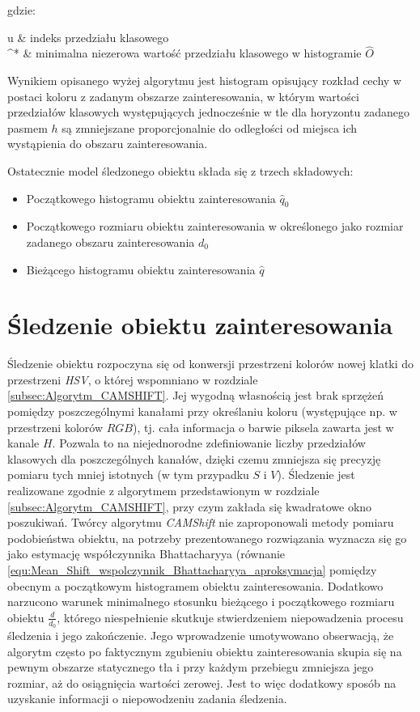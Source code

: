 \noindent
gdzie:
\begin{conditions}
	 u & indeks przedziału klasowego  \\
	 ^* & minimalna niezerowa wartość przedziału klasowego w histogramie $\hat{O}$
\end{conditions}

Wynikiem opisanego wyżej algorytmu jest histogram opisujący rozkład cechy w postaci koloru z zadanym obszarze zainteresowania, w którym wartości przedziałów klasowych występujących jednocześnie w tle dla horyzontu zadanego pasmem $h$ są zmniejszane proporcjonalnie do odległości od miejsca ich wystąpienia do obszaru zainteresowania.

Ostatecznie model śledzonego obiektu składa się z trzech składowych:

\begin{itemize}

	\item Początkowego histogramu obiektu zainteresowania $\hat{q}_0$
	\item Początkowego rozmiaru obiektu zainteresowania w określonego jako rozmiar zadanego obszaru zainteresowania $d_0$
	\item Bieżącego histogramu obiektu zainteresowania $\hat{q}$

\end{itemize}

\section{Śledzenie obiektu zainteresowania}
\label{sec:Modul_CAMShift_Sledzenie_obiektu_zainteresowania}

Śledzenie obiektu rozpoczyna się od konwersji przestrzeni kolorów nowej klatki do przestrzeni \textit{HSV}, o której wspomniano w rozdziale \ref{subsec:Algorytm_CAMSHIFT}. Jej wygodną własnością jest brak sprzężeń pomiędzy poszczególnymi kanałami przy określaniu koloru (występujące np. w przestrzeni kolorów $RGB$), tj. cała informacja o barwie piksela zawarta jest w kanale $H$. Pozwala to na niejednorodne zdefiniowanie liczby przedziałów klasowych dla poszczególnych kanałów, dzięki czemu zmniejsza się precyzję pomiaru tych mniej istotnych (w tym przypadku $S$ i $V$). Śledzenie jest realizowane zgodnie z algorytmem przedstawionym w rozdziale \ref{subsec:Algorytm_CAMSHIFT}, przy czym zakłada się kwadratowe okno poszukiwań. Twórcy algorytmu \textit{CAMShift} nie zaproponowali metody pomiaru podobieństwa obiektu, na potrzeby prezentowanego rozwiązania wyznacza się go jako estymację współczynnika Bhattacharyya (równanie \ref{equ:Mean_Shift_wspolczynnik_Bhattacharyya_aproksymacja} pomiędzy obecnym a początkowym histogramem obiektu zainteresowania. Dodatkowo narzucono warunek minimalnego stosunku bieżącego i początkowego rozmiaru obiektu $\frac{d}{d_0}$, którego niespełnienie skutkuje stwierdzeniem niepowadzenia procesu śledzenia i jego zakończenie. Jego wprowadzenie umotywowano obserwacją, że algorytm często po faktycznym zgubieniu obiektu zainteresowania skupia się na pewnym obszarze statycznego tła i przy każdym przebiegu zmniejsza jego rozmiar, aż do osiągnięcia wartości zerowej. Jest to więc dodatkowy sposób na uzyskanie informacji o niepowodzeniu zadania śledzenia.


